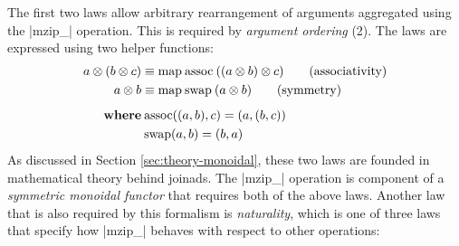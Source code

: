 \documentclass[preprint]{sigplanconf}
\begin{document}
The first two laws allow arbitrary rearrangement of arguments aggregated using the |mzip_| operation.
This is required by \textit{argument ordering} (2). The laws are expressed using two helper functions:
\begin{align*}
  a \otimes (b \otimes c) &\equiv \text{map} \: \text{assoc} \: ((a \otimes b) \otimes c) \tag{associativity} \\
  a \otimes b &\equiv \text{map} \: \text{swap} \: (a \otimes b) \tag{symmetry} \\
\\[-10pt]
  \textbf{where} & \: \text{assoc}((a,b), c) = (a,(b,c))\\
                 & \: \text{swap}(a,b) = (b,a)
\end{align*}
As discussed in Section \ref{sec:theory-monoidal}, these two laws are founded in mathematical theory 
behind joinads. The |mzip_| operation is component of a \textit{symmetric monoidal functor} that requires 
both of the above laws. Another law that is also required by this formalism is \textit{naturality}, which 
is one of three laws that specify how |mzip_| behaves with respect to other operations:
\end{document}
